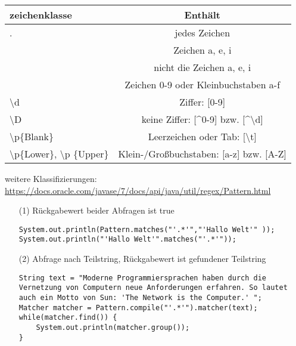 \begin{table} [H]
\centering
\begin{tabular}{l|c}
\multicolumn{1}{l}{\textbf{zeichenklasse}} & \textbf{Enthält}\\
\hline
. & jedes Zeichen \\
\hline
[aei] & Zeichen a, e, i \\
\hline
[\^{}aei] & nicht die Zeichen a, e, i \\
\hline
[0-9a-f] & Zeichen 0-9 oder Kleinbuchstaben a-f \\
\hline
\textbackslash d & Ziffer: [0-9] \\
\hline
\textbackslash D & keine Ziffer: [\^{}0-9] bzw. [\^{}\textbackslash d] \\
\hline
\textbackslash p\{Blank\} & Leerzeichen oder Tab: [\textbackslash t] \\
\hline
\textbackslash p\{Lower\}, \textbackslash p \{Upper\} & Klein-/Großbuchstaben: [a-z] bzw. [A-Z] \\
\hline
\end{tabular}
\end{table}
weitere Klassifizierungen: \\
\href{https://docs.oracle.com/javase/7/docs/api/java/util/regex/Pattern.html}{https://docs.oracle.com/javase/7/docs/api/java/util/regex/Pattern.html}
\nsecend
{}
\begin{itemize}
\item[(1)] Rückgabewert beider Abfragen ist true
\begin{lstlisting}
System.out.println(Pattern.matches("'.*'","'Hallo Welt'" ));
System.out.println("'Hallo Welt'".matches("'.*'"));
\end{lstlisting}
\item[(2)] Abfrage nach Teilstring, Rückgabewert ist gefundener Teilstring
\begin{lstlisting}
String text = "Moderne Programmiersprachen haben durch die Vernetzung von Computern neue Anforderungen erfahren. So lautet auch ein Motto von Sun: 'The Network is the Computer.' ";
Matcher matcher = Pattern.compile("'.*'").matcher(text);
while(matcher.find()) {
	System.out.println(matcher.group());
}
\end{lstlisting}
\end{itemize}
\nsecend
\nsecend